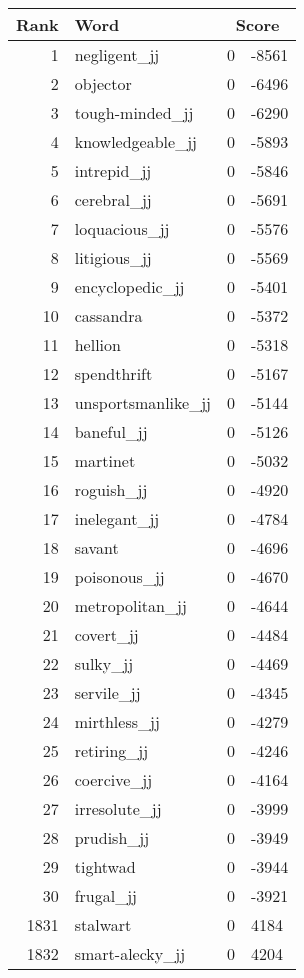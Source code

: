 \begin{longtable}[!htbp]{| rlr@{.}l |}
    \hline
    \textbf{Rank} & \textbf{Word} & \multicolumn{2}{c|}{\textbf{Score}} \\
    \hline
    \endhead
    1 & negligent\_jj & 0 & -8561 \\
    2 & objector & 0 & -6496 \\
    3 & tough-minded\_jj & 0 & -6290 \\
    4 & knowledgeable\_jj & 0 & -5893 \\
    5 & intrepid\_jj & 0 & -5846 \\
    6 & cerebral\_jj & 0 & -5691 \\
    7 & loquacious\_jj & 0 & -5576 \\
    8 & litigious\_jj & 0 & -5569 \\
    9 & encyclopedic\_jj & 0 & -5401 \\
    10 & cassandra & 0 & -5372 \\
    11 & hellion & 0 & -5318 \\
    12 & spendthrift & 0 & -5167 \\
    13 & unsportsmanlike\_jj & 0 & -5144 \\
    14 & baneful\_jj & 0 & -5126 \\
    15 & martinet & 0 & -5032 \\
    16 & roguish\_jj & 0 & -4920 \\
    17 & inelegant\_jj & 0 & -4784 \\
    18 & savant & 0 & -4696 \\
    19 & poisonous\_jj & 0 & -4670 \\
    20 & metropolitan\_jj & 0 & -4644 \\
    21 & covert\_jj & 0 & -4484 \\
    22 & sulky\_jj & 0 & -4469 \\
    23 & servile\_jj & 0 & -4345 \\
    24 & mirthless\_jj & 0 & -4279 \\
    25 & retiring\_jj & 0 & -4246 \\
    26 & coercive\_jj & 0 & -4164 \\
    27 & irresolute\_jj & 0 & -3999 \\
    28 & prudish\_jj & 0 & -3949 \\
    29 & tightwad & 0 & -3944 \\
    30 & frugal\_jj & 0 & -3921 \\
    1831 & stalwart & 0 & 4184 \\
    1832 & smart-alecky\_jj & 0 & 4204 \\

\end{longtable}
